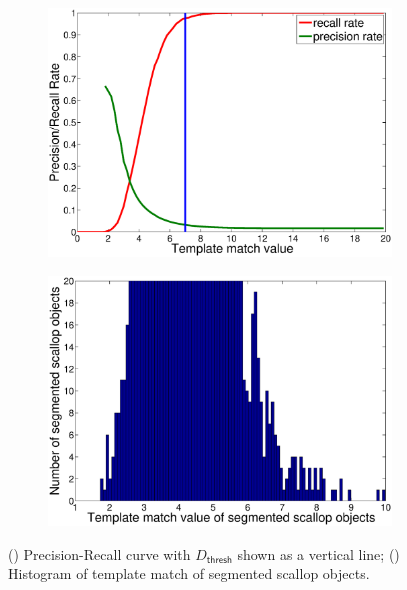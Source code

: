 \documentclass {udthesis}
\begin{document}
%
\begin{figure}
  \centering
  \begin{subfigure}{0.47\textwidth}
      \includegraphics[width=\textwidth]{precision_recall}
      \caption{}
      \label{subfig:precision_recall}
  \end{subfigure}
  \begin{subfigure}{0.47\textwidth}
      \includegraphics[width=\textwidth]{template_thresh_hist}         
      \caption{}
      \label{subfig:template_hist}
  \end{subfigure}
  \caption[Precision-Recall curves for Classification Layer]{() Precision-Recall curve with $D_\mathsf{thresh}$ shown as
  a vertical line; () 
  Histogram of template match of segmented scallop objects.}
  \label{detection-curves}
\end{figure}
\end{document}
